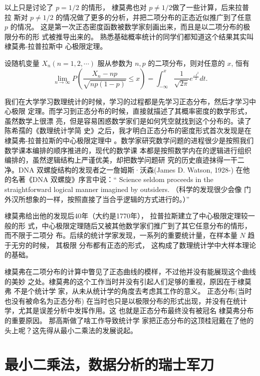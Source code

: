 以上只是讨论了 $p=1/2$ 的情形， 棣莫弗也对 $p \ne 1/2$做了一些计算，后来拉普拉
斯对 $p \ne 1/2$ 的情况做了更多的分析，并把二项分布的正态近似推广到了任意 $p$
的情况。 这是第一次正态密度函数被数学家刻画出来，而且是以二项分布的极限分布的形
式被推导出来的。 熟悉基础概率统计的同学们都知道这个结果其实叫棣莫弗-拉普拉斯中
心极限定理。

\begin{theorem}
设随机变量 $X_n (n=1,2,\cdots)$ 服从参数为 $n,p$ 的二项分布，则对任意的 $x$, 恒有
$$ \lim_{n\rightarrow\infty}P\left( \frac{X_n - np}{\sqrt{np(1-p)}} \le x \right)
 = \int_{-\infty}^x \frac{1}{\sqrt{2\pi}} e^{\frac{-t^2}{2}}dt .
$$
\end{theorem}

我们在大学学习数理统计的时候，学习的过程都是先学习正态分布，然后才学习中心极限
定理。而学习到正态分布的时候，直接就描述了其概率密度的数学形式，虽然数学上很漂
亮，但是容易困惑数学家们是如何凭空就找到这个分布的。读了陈希孺的《数理统计学简
史》之后，我才明白正态分布的密度形式首次发现是在棣莫弗-拉普拉斯的中心极限定理中
。数学家研究数学问题的进程很少是按照我们数学课本编排的顺序推进的，现代的数学课
本都是按照数学内在的逻辑进行组织编排的，虽然逻辑结构上严谨优美，却把数学问题研
究的历史痕迹抹得一干二净。DNA 双螺旋结构的发现者之一詹姆斯·沃森(James D.
Watson, 1928-) 在他的名著《DNA 双螺旋》序言中说：“ Science seldom proceeds in
the straightforward logical manner imagined by outsiders. （科学的发现很少会像
门外汉所想象的一样，按照直接了当合乎逻辑的方式进行的。）”


棣莫弗给出他的发现后40年（大约是1770年）， 拉普拉斯建立了中心极限定理较一般的形
式，中心极限定理随后又被其他数学家们推广到了其它任意分布的情形，而不限于二项分
布。后续的统计学家发现，一系列的重要统计量，在样本量 $N$ 趋于无穷的时候， 其极限
分布都有正态的形式， 这构成了数理统计学中大样本理论的基础。

棣莫弗在二项分布的计算中瞥见了正态曲线的模样，不过他并没有能展现这个曲线的美妙
之处。棣莫弗的这个工作当时并没有引起人们足够的重视，原因在于棣莫弗 不是个统计学
家，从未从统计学的角度去考虑其工作的意义。 正态分布(当时也没有被命名为正态分布)
在当时也只是以极限分布的形式出现，并没有在统计学，尤其是误差分析中发挥作用。这
也就是正态分布最终没有被冠名 棣莫弗分布的重要原因。 那高斯做了啥工作导致统计学
家把正态分布的这顶桂冠戴在了他的头上呢？这先得从最小二乘法的发展说起。

\section{最小二乘法，数据分析的瑞士军刀}

